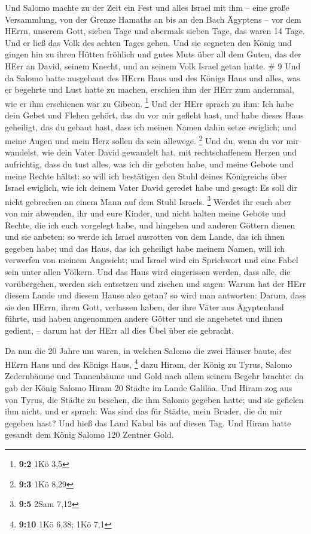  Und Salomo machte zu der Zeit ein Fest und alles Israel
mit ihm -- eine große Versammlung, von der Grenze Hamaths an bis an den
Bach Ägyptens -- vor dem HErrn, unserem Gott, sieben Tage und abermals
sieben Tage, das waren 14 Tage.  Und er ließ das Volk des
achten Tages gehen. Und sie segneten den König und gingen hin zu ihren
Hütten fröhlich und gutes Muts über all dem Guten, das der HErr an
David, seinem Knecht, und an seinem Volk Israel getan hatte. \# 9
 Und da Salomo hatte ausgebaut des HErrn Haus und des Königs
Haus und alles, was er begehrte und Lust hatte zu machen, 
erschien ihm der HErr zum andernmal, wie er ihm erschienen war zu
Gibeon. \footnote{\textbf{9:2} 1Kö 3,5}  Und der HErr sprach
zu ihm: Ich habe dein Gebet und Flehen gehört, das du vor mir gefleht
hast, und habe dieses Haus geheiligt, das du gebaut hast, dass ich
meinen Namen dahin setze ewiglich; und meine Augen und mein Herz sollen
da sein allewege. \footnote{\textbf{9:3} 1Kö 8,29}  Und du,
wenn du vor mir wandelst, wie dein Vater David gewandelt hat, mit
rechtschaffenem Herzen und aufrichtig, dass du tust alles, was ich dir
geboten habe, und meine Gebote und meine Rechte hältst:  so
will ich bestätigen den Stuhl deines Königreichs über Israel ewiglich,
wie ich deinem Vater David geredet habe und gesagt: Es soll dir nicht
gebrechen an einem Mann auf dem Stuhl Israels. \footnote{\textbf{9:5}
  2Sam 7,12}  Werdet ihr euch aber von mir abwenden, ihr und
eure Kinder, und nicht halten meine Gebote und Rechte, die ich euch
vorgelegt habe, und hingehen und anderen Göttern dienen und sie anbeten:
 so werde ich Israel ausrotten von dem Lande, das ich ihnen
gegeben habe; und das Haus, das ich geheiligt habe meinem Namen, will
ich verwerfen von meinem Angesicht; und Israel wird ein Sprichwort und
eine Fabel sein unter allen Völkern.  Und das Haus wird
eingerissen werden, dass alle, die vorübergehen, werden sich entsetzen
und zischen und sagen: Warum hat der HErr diesem Lande und diesem Hause
also getan?  so wird man antworten: Darum, dass sie den
HErrn, ihren Gott, verlassen haben, der ihre Väter aus Ägyptenland
führte, und haben angenommen andere Götter und sie angebetet und ihnen
gedient, -- darum hat der HErr all dies Übel über sie gebracht.

 Da nun die 20 Jahre um waren, in welchen Salomo die zwei
Häuser baute, des HErrn Haus und des Königs Haus, \footnote{\textbf{9:10}
  1Kö 6,38; 1Kö 7,1}  dazu Hiram, der König zu Tyrus,
Salomo Zedernbäume und Tannenbäume und Gold nach allem seinem Begehr
brachte: da gab der König Salomo Hiram 20 Städte im Lande Galiläa.
 Und Hiram zog aus von Tyrus, die Städte zu besehen, die
ihm Salomo gegeben hatte; und sie gefielen ihm nicht,  und
er sprach: Was sind das für Städte, mein Bruder, die du mir gegeben
hast? Und hieß das Land Kabul bis auf diesen Tag.  Und
Hiram hatte gesandt dem König Salomo 120 Zentner Gold.

